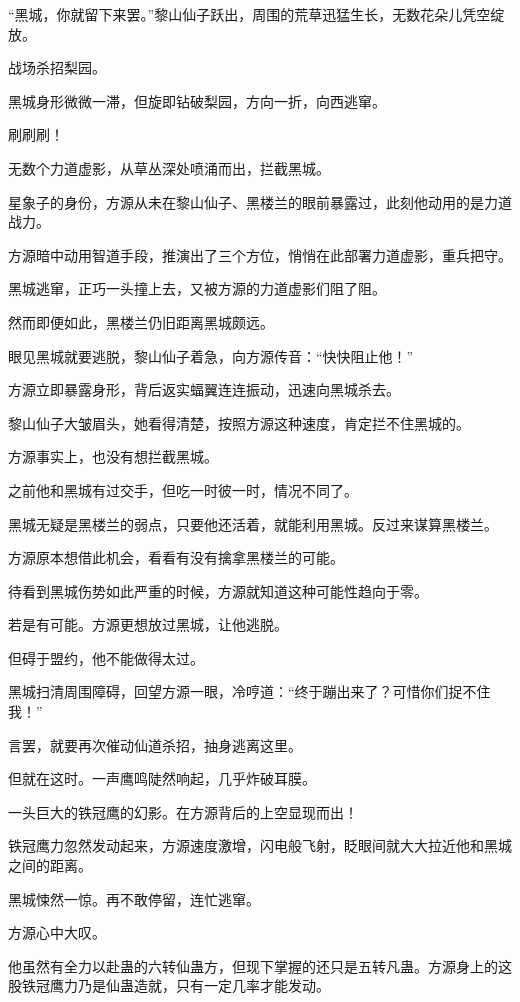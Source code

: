 \begin{this_body}
“黑城，你就留下来罢。”黎山仙子跃出，周围的荒草迅猛生长，无数花朵儿凭空绽放。

战场杀招梨园。

黑城身形微微一滞，但旋即钻破梨园，方向一折，向西逃窜。

刷刷刷！

无数个力道虚影，从草丛深处喷涌而出，拦截黑城。

星象子的身份，方源从未在黎山仙子、黑楼兰的眼前暴露过，此刻他动用的是力道战力。

方源暗中动用智道手段，推演出了三个方位，悄悄在此部署力道虚影，重兵把守。

黑城逃窜，正巧一头撞上去，又被方源的力道虚影们阻了阻。

然而即便如此，黑楼兰仍旧距离黑城颇远。

眼见黑城就要逃脱，黎山仙子着急，向方源传音：“快快阻止他！”

方源立即暴露身形，背后返实蝠翼连连振动，迅速向黑城杀去。

黎山仙子大皱眉头，她看得清楚，按照方源这种速度，肯定拦不住黑城的。

方源事实上，也没有想拦截黑城。

之前他和黑城有过交手，但吃一时彼一时，情况不同了。

黑城无疑是黑楼兰的弱点，只要他还活着，就能利用黑城。反过来谋算黑楼兰。

方源原本想借此机会，看看有没有擒拿黑楼兰的可能。

待看到黑城伤势如此严重的时候，方源就知道这种可能性趋向于零。

若是有可能。方源更想放过黑城，让他逃脱。

但碍于盟约，他不能做得太过。

黑城扫清周围障碍，回望方源一眼，冷哼道：“终于蹦出来了？可惜你们捉不住我！”

言罢，就要再次催动仙道杀招，抽身逃离这里。

但就在这时。一声鹰鸣陡然响起，几乎炸破耳膜。

一头巨大的铁冠鹰的幻影。在方源背后的上空显现而出！

铁冠鹰力忽然发动起来，方源速度激增，闪电般飞射，眨眼间就大大拉近他和黑城之间的距离。

黑城悚然一惊。再不敢停留，连忙逃窜。

方源心中大叹。

他虽然有全力以赴蛊的六转仙蛊方，但现下掌握的还只是五转凡蛊。方源身上的这股铁冠鹰力乃是仙蛊造就，只有一定几率才能发动。


\end{this_body}
